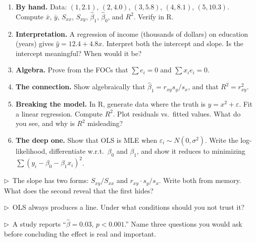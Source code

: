 \begin{enumerate}
  \item \textbf{By hand.} Data: $(1, 2.1)$, $(2, 4.0)$, $(3, 5.8)$, $(4, 8.1)$, $(5, 10.3)$. Compute $\bar{x}$, $\bar{y}$, $S_{xx}$, $S_{xy}$, $\hat\beta_1$, $\hat\beta_0$, and $R^2$. Verify in R.

  \item \textbf{Interpretation.} A regression of income (thousands of dollars) on education (years) gives $\hat{y} = 12.4 + 4.8x$. Interpret both the intercept and slope. Is the intercept meaningful? When would it be?

  \item \textbf{Algebra.} Prove from the FOCs that $\sum e_i = 0$ and $\sum x_i e_i = 0$.

  \item \textbf{The connection.} Show algebraically that $\hat\beta_1 = r_{xy} s_y / s_x$, and that $R^2 = r_{xy}^2$.

  \item \textbf{Breaking the model.} In R, generate data where the truth is $y = x^2 + \varepsilon$. Fit a linear regression. Compute $R^2$. Plot residuals vs.\ fitted values. What do you see, and why is $R^2$ misleading?

  \item \textbf{The deep one.} Show that OLS is MLE when $\varepsilon_i \sim N(0, \sigma^2)$. Write the log-likelihood, differentiate w.r.t.\ $\beta_0$ and $\beta_1$, and show it reduces to minimizing $\sum(y_i - \beta_0 - \beta_1 x_i)^2$.
\end{enumerate}

\begin{reflect}
$\triangleright$~The slope has two forms: $S_{xy}/S_{xx}$ and $r_{xy} \cdot s_y/s_x$. Write both from memory. What does the second reveal that the first hides?

\smallskip
$\triangleright$~OLS always produces a line. Under what conditions should you not trust it?

\smallskip
$\triangleright$~A study reports ``$\hat\beta = 0.03$, $p < 0.001$.'' Name three questions you would ask before concluding the effect is real and important.
\end{reflect}

